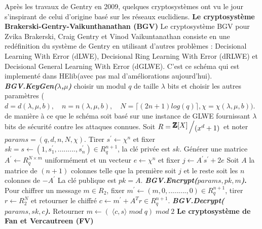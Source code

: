\documentclass[a4paper,12pt]{article}
\begin{document}
Après les travaux de Gentry en 2009, quelques cryptosystèmes ont vu le jour s’inspirant de celui d’origine basé sur les réseaux euclidiens.\newline
\textbf{Le cryptosystème Brakerski-Gentry-Vaikunthanathan (BGV)}\newline
Le cryptosystème BGV pour Zvika Brakerski, Craig Gentry et Vinod Vaikuntanathan consiste en une redéfinition du système de Gentry en
utilisant d’autres problèmes : Decisional Learning With Error (dLWE), Decisional Ring Learning With Error (dRLWE) et Decisional General Learning With Error (dGLWE). C’est ce schéma qui est implementé dans HElib(avec pas mal d’améliorations aujourd’hui).\newline
\newline
\textbf{\textit{BGV.KeyGen($\lambda$,$\mu$)}}\newline
choisir un modul $q$ de taille $\lambda$ bits et choisir les autres paramètres ($d=d(\lambda,\mu,b),\quad n=n(\lambda,\mu,b), \quad N = \lceil(2n+1)log(q)\rceil, \chi = \chi(\lambda,\mu,b))$.\newline
de manière à ce que le schéma soit basé sur une instance de GLWE fournissant $\lambda$ bits de sécurité contre les attaques connues.\newline
Soit $R = \bigslant{\pmb{\mathbb{Z}}[X]}{(x^{d}+1)}$ et noter $params= (q,d,n,N,\chi).$\newline
Tirer $s^{'}\xleftarrow{}{} \chi^{n}$ et fixer $sk = s\xleftarrow{}{}(1,s^{'}_1,.........,s^{'}_n)\in R^{n+1}_q$, la clé privée est $sk$.\newline
Générer une matrice $A^{'}\xleftarrow{}{}R^{N\times m}_q$ uniformément et un vecteur $e \xleftarrow{}{} \chi^{n}$ et fixer $j \xleftarrow{}{}A^{'}s^{'} + 2e$ Soit $A$ la matrice de $( n + 1)$ colonnes telle que la première soit $j$ et le reste soit les $n$ colonnes de $-A^{'}$
La clé publique est $pk = A$.\newline
\newline
\textbf{\textit{BGV.Encrypt($params,pk,m$)}.}\newline
Pour chiffrer un message $m \in R_2$, fixer $m^{'}\xleftarrow{}{}(m,0,.........,0)\in R^{n+1}_q$, tirer $r\xleftarrow{}{} R^N_2$ et retourner le chiffré $c \xleftarrow{}{} m^{'}+A^Tr\in R^{n+1}_q.$\newline
\newline
\textbf{\textit{BGV.Decrypt($params,sk,c$)}.}\newline
Retourner $m \xleftarrow{}{} (\;\langle c,s\rangle \;mod\;q)\;mod \;2$
\newpage
\textbf{Le cryptosystème de Fan et Vercautreen (FV)}\newline
\end{document}
